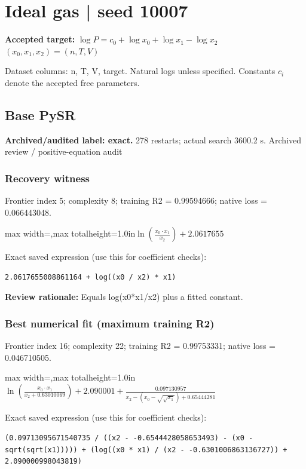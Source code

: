 \documentclass[10pt,letterpaper,landscape]{article}
\begin{document}
\section*{Ideal gas | seed 10007}
\textbf{Accepted target:} $\displaystyle \log P=c_0+\log x_0+\log x_1-\log x_2$\hfill $(x_0,x_1,x_2)=(n,T,V)$\par
{\small Dataset columns: n, T, V, target. Natural logs unless specified. Constants $c_i$ denote the accepted free parameters.}\par\medskip
\begin{minipage}[t]{0.485\textwidth}
\subsection*{Base PySR}
\textbf{Archived/audited label: exact.} 278 restarts; actual search 3600.2 s.
{\small Archived review / positive-equation audit}
\subsubsection*{Recovery witness}
Frontier index 5; complexity 8; training R2 = 0.99594666; native loss = 0.066443048.
\begin{center}\begin{adjustbox}{max width=\linewidth,max totalheight=1.0in}$\displaystyle \ln{\left(\frac{x_{0} \cdot x_{1}}{x_{2}} \right)} + 2.0617655$\end{adjustbox}\end{center}
{\scriptsize Exact saved expression (use this for coefficient checks):}
\begin{lstlisting}
2.0617655008861164 + log((x0 / x2) * x1)
\end{lstlisting}
{\small\textbf{Review rationale:} Equals log(x0*x1/x2) plus a fitted constant.}
\subsubsection*{Best numerical fit (maximum training R2)}
Frontier index 16; complexity 22; training R2 = 0.99753331; native loss = 0.046710505.
\begin{center}\begin{adjustbox}{max width=\linewidth,max totalheight=1.0in}$\displaystyle \ln{\left(\frac{x_{0} \cdot x_{1}}{x_{2} + 0.63010069} \right)} + 2.090001 + \frac{0.097130957}{x_{2} - \left(x_{0} - \sqrt{\sqrt{x_{1}}}\right) + 0.65444281}$\end{adjustbox}\end{center}
{\scriptsize Exact saved expression (use this for coefficient checks):}
\begin{lstlisting}
(0.09713095671540735 / ((x2 - -0.6544428058653493) - (x0 - sqrt(sqrt(x1))))) + (log((x0 * x1) / (x2 - -0.6301006863136727)) + 2.090000998043819)
\end{lstlisting}
\end{minipage}\hfill
\end{document}

